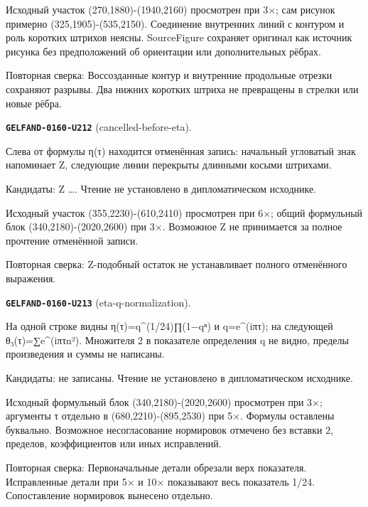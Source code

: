Исходный участок (270,1880)-(1940,2160) просмотрен при 3×; сам рисунок примерно (325,1905)-(535,2150). Соединение внутренних линий с контуром и роль коротких штрихов неясны. SourceFigure сохраняет оригинал как источник рисунка без предположений об ориентации или дополнительных рёбрах.\par
Повторная сверка: Воссозданные контур и внутренние продольные отрезки сохраняют разрывы. Два нижних коротких штриха не превращены в стрелки или новые рёбра.\par\medskip
\par\noindent\leavevmode{}\label{GELFAND-0160-U212}\label{GELFAND-P001479:cancelled-before-eta}\textbf{\texttt{GELFAND-0160-U212}} (cancelled-before-eta).\nopagebreak[4]\par
Слева от формулы η(τ) находится отменённая запись: начальный угловатый знак напоминает Z, следующие линии перекрыты длинными косыми штрихами.\par
Кандидаты: Z …. Чтение не установлено в дипломатическом исходнике.\par
Исходный участок (355,2230)-(610,2410) просмотрен при 6×; общий формульный блок (340,2180)-(2020,2600) при 3×. Возможное Z не принимается за полное прочтение отменённой записи.\par
Повторная сверка: Z-подобный остаток не устанавливает полного отменённого выражения.\par\medskip
\par\noindent\leavevmode{}\label{GELFAND-0160-U213}\label{GELFAND-P001479:eta-q-normalization}\textbf{\texttt{GELFAND-0160-U213}} (eta-q-normalization).\nopagebreak[4]\par
На одной строке видны η(τ)=q\textasciicircum{}(1/24)∏(1−qⁿ) и q=e\textasciicircum{}(iπτ); на следующей θ₃(τ)=∑e\textasciicircum{}(iπτn²). Множителя 2 в показателе определения q не видно, пределы произведения и суммы не написаны.\par
Кандидаты: не записаны. Чтение не установлено в дипломатическом исходнике.\par
Исходный формульный блок (340,2180)-(2020,2600) просмотрен при 3×; аргументы τ отдельно в (680,2210)-(895,2530) при 5×. Формулы оставлены буквально. Возможное несогласование нормировок отмечено без вставки 2, пределов, коэффициентов или иных исправлений.\par
Повторная сверка: Первоначальные детали обрезали верх показателя. Исправленные детали при 5× и 10× показывают весь показатель 1/24. Сопоставление нормировок вынесено отдельно.\par\medskip
